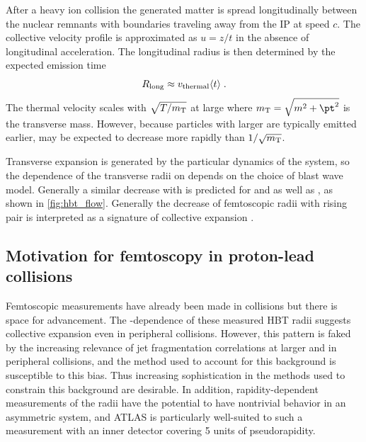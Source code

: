 After a heavy ion collision the generated matter is spread longitudinally between the nuclear remnants with boundaries traveling away from the \ac{IP} at speed $c$.
The collective velocity profile is approximated as $u = z/t$ in the absence of longitudinal acceleration.
The longitudinal radius is then determined by the expected emission time
\begin{equation}
  R_{\mathrm{long}} \approx v_\textrm{thermal} \langle t \rangle \; .
\end{equation}
The thermal velocity scales with $\sqrt{T/m_\mathrm{T}}$ at large \mt where $\mt = \sqrt{m^2 + \pt^2}$ is the transverse mass.
However, because particles with larger \mt are typically emitted earlier, \Rlong may be expected to decrease more rapidly than $1/\sqrt{m_\mathrm{T}}$.

Transverse expansion is generated by the particular dynamics of the system, so the dependence of the transverse radii on \mt depends on the choice of blast wave model.
Generally a similar decrease with \mt is predicted for \Rout and \Rside as well as \Rlong, as shown in \cref{fig:hbt_flow}. Generally the decrease of femtoscopic radii with rising pair \kt is interpreted as a signature of collective expansion \cite{Kolb:2003dz}.



\subsection{Motivation for femtoscopy in proton-lead collisions}
Femtoscopic measurements have already been made in \pPb collisions \cite{Abelev:2014pja,Adam:2015pya} but there is space for advancement.
The \kt-dependence of these measured \ac{HBT} radii suggests collective expansion even in peripheral collisions.
However, this pattern is faked by the increasing relevance of jet fragmentation correlations at larger \kt and in peripheral collisions, and the method used to account for this background is susceptible to this bias.
Thus increasing sophistication in the methods used to constrain this background are desirable.
In addition, rapidity-dependent measurements of the radii have the potential to have nontrivial behavior in an asymmetric \pA system, and ATLAS is particularly well-suited to such a measurement with an inner detector covering 5 units of pseudorapidity.

